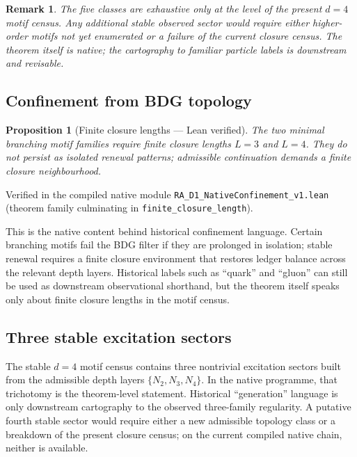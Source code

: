 \documentclass[11pt]{article}
\newtheorem{proposition}{Proposition}
\newtheorem{remark}{Remark}
\begin{document}
\begin{remark}
The five classes are exhaustive only at the level of the present $d=4$ motif census. Any additional stable observed sector would require either higher-order motifs not yet enumerated or a failure of the current closure census. The theorem itself is native; the cartography to familiar particle labels is downstream and revisable.
\end{remark}

\subsection{Confinement from BDG topology}

\begin{proposition}[Finite closure lengths --- Lean verified]
\label{prop:confinement}
The two minimal branching motif families require finite closure lengths $L=3$ and $L=4$. They do not persist as isolated renewal patterns; admissible continuation demands a finite closure neighbourhood.
\end{proposition}

Verified in the compiled native module \texttt{RA\_D1\_NativeConfinement\_v1.lean} (theorem family culminating in \texttt{finite\_closure\_length}).

This is the native content behind historical confinement language. Certain branching motifs fail the BDG filter if they are prolonged in isolation; stable renewal requires a finite closure environment that restores ledger balance across the relevant depth layers. Historical labels such as ``quark'' and ``gluon'' can still be used as downstream observational shorthand, but the theorem itself speaks only about finite closure lengths in the motif census.

\subsection{Three stable excitation sectors}

The stable $d=4$ motif census contains three nontrivial excitation sectors built from the admissible depth layers $\{N_2,N_3,N_4\}$. In the native programme, that trichotomy is the theorem-level statement. Historical ``generation'' language is only downstream cartography to the observed three-family regularity. A putative fourth stable sector would require either a new admissible topology class or a breakdown of the present closure census; on the current compiled native chain, neither is available.
\end{document}
